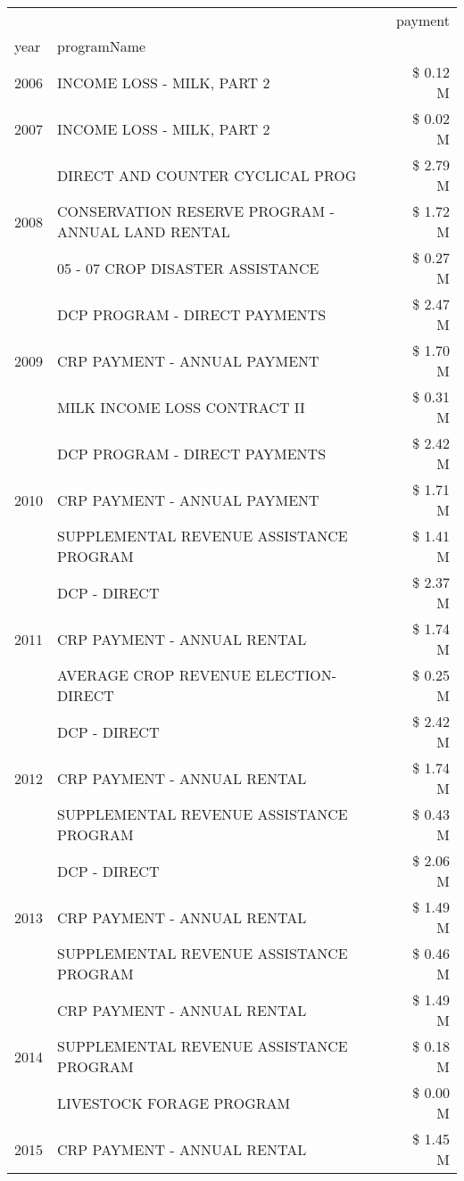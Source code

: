 \begin{tabular}{llr}
\toprule
 &  & payment \\
year & programName &  \\
\midrule
2006 & INCOME LOSS - MILK, PART 2 & \$ 0.12 M \\
\cline{1-3}
2007 & INCOME LOSS - MILK, PART 2 & \$ 0.02 M \\
\cline{1-3}
\multirow[t]{3}{*}{2008} & DIRECT AND COUNTER CYCLICAL PROG & \$ 2.79 M \\
 & CONSERVATION RESERVE PROGRAM - ANNUAL LAND RENTAL & \$ 1.72 M \\
 & 05 - 07 CROP DISASTER ASSISTANCE & \$ 0.27 M \\
\cline{1-3}
\multirow[t]{3}{*}{2009} & DCP PROGRAM - DIRECT PAYMENTS & \$ 2.47 M \\
 & CRP PAYMENT - ANNUAL PAYMENT & \$ 1.70 M \\
 & MILK INCOME LOSS CONTRACT II & \$ 0.31 M \\
\cline{1-3}
\multirow[t]{3}{*}{2010} & DCP PROGRAM - DIRECT PAYMENTS & \$ 2.42 M \\
 & CRP PAYMENT - ANNUAL PAYMENT & \$ 1.71 M \\
 & SUPPLEMENTAL REVENUE ASSISTANCE PROGRAM & \$ 1.41 M \\
\cline{1-3}
\multirow[t]{3}{*}{2011} & DCP - DIRECT & \$ 2.37 M \\
 & CRP PAYMENT - ANNUAL RENTAL & \$ 1.74 M \\
 & AVERAGE CROP REVENUE ELECTION-DIRECT & \$ 0.25 M \\
\cline{1-3}
\multirow[t]{3}{*}{2012} & DCP - DIRECT & \$ 2.42 M \\
 & CRP PAYMENT - ANNUAL RENTAL & \$ 1.74 M \\
 & SUPPLEMENTAL REVENUE ASSISTANCE PROGRAM & \$ 0.43 M \\
\cline{1-3}
\multirow[t]{3}{*}{2013} & DCP - DIRECT & \$ 2.06 M \\
 & CRP PAYMENT - ANNUAL RENTAL & \$ 1.49 M \\
 & SUPPLEMENTAL REVENUE ASSISTANCE PROGRAM & \$ 0.46 M \\
\cline{1-3}
\multirow[t]{3}{*}{2014} & CRP PAYMENT - ANNUAL RENTAL & \$ 1.49 M \\
 & SUPPLEMENTAL REVENUE ASSISTANCE PROGRAM & \$ 0.18 M \\
 & LIVESTOCK FORAGE PROGRAM & \$ 0.00 M \\
\cline{1-3}
\multirow[t]{3}{*}{2015} & CRP PAYMENT - ANNUAL RENTAL & \$ 1.45 M \\

\end{tabular}
